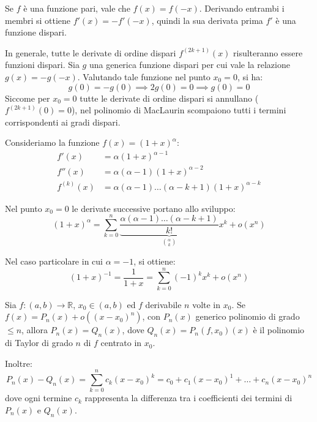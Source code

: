 \documentclass[12pt]{report}
\newcommand{\R}{\mathbb{R}}
\begin{document}
	\begin{dimostrazione}{}{}
		
		Se $f$ è una funzione pari, vale che $f(x) = f(-x)$. Derivando entrambi i membri si ottiene $f'(x) = -f'(-x)$, quindi la sua derivata prima $f'$ è una funzione dispari.
		
		In generale, tutte le derivate di ordine dispari $f^{(2k+1)}(x)$ risulteranno essere funzioni dispari.
		Sia $g$ una generica funzione dispari per cui vale la relazione $g(x) = -g(-x)$. Valutando tale funzione nel punto $x_0 = 0$, si ha:
		\[
		g(0) = -g(0) \implies 2g(0) = 0 \implies g(0) = 0
		\]
		Siccome per $x_0 = 0$ tutte le derivate di ordine dispari si annullano ($f^{(2k+1)}(0) = 0$), nel polinomio di MacLaurin scompaiono tutti i termini corrispondenti ai gradi dispari.
		
	\end{dimostrazione}
	
	Consideriamo la funzione $f(x) = (1 + x)^\alpha$:
	\begin{align*}
		f'(x) &= \alpha(1 + x)^{\alpha - 1} \\
		f''(x) &= \alpha(\alpha - 1)(1 + x)^{\alpha - 2} \\
		f^{(k)}(x) &= \alpha(\alpha - 1)\dots(\alpha - k + 1)(1 + x)^{\alpha - k}
	\end{align*}
	
	Nel punto $x_0 = 0$ le derivate successive portano allo sviluppo:
	\[
	(1 + x)^\alpha = \sum_{k=0}^n \underbrace{\frac{\alpha(\alpha - 1)\dots(\alpha - k + 1)}{k!}}_{\binom{\alpha}{k}} x^k + o(x^n)
	\]
	
	Nel caso particolare in cui $\alpha = -1$, si ottiene:
	\[
	(1 + x)^{-1} = \frac{1}{1 + x} = \sum_{k=0}^n (-1)^k x^k + o(x^n)
	\]
	
	\begin{teorema}{}{}
		
		Sia $f: (a, b) \to \R$, $x_0 \in (a, b)$ ed $f$ derivabile $n$ volte in $x_0$.
		Se $f(x) = P_n(x) + o((x - x_0)^n)$, con $P_n(x)$ generico polinomio di grado $\le n$, allora $P_n(x) = Q_n(x)$, dove $Q_n(x) = P_n(f, x_0)(x)$ è il polinomio di Taylor di grado $n$ di $f$ centrato in $x_0$.
		
		Inoltre:
		\[
		P_n(x) - Q_n(x) = \sum_{k=0}^n c_k (x - x_0)^k = c_0 + c_1(x - x_0)^1 + \dots + c_n(x - x_0)^n
		\]
		dove ogni termine $c_k$ rappresenta la differenza tra i coefficienti dei termini di $P_n(x)$ e $Q_n(x)$.
		
	\end{teorema}
	
\end{document}
